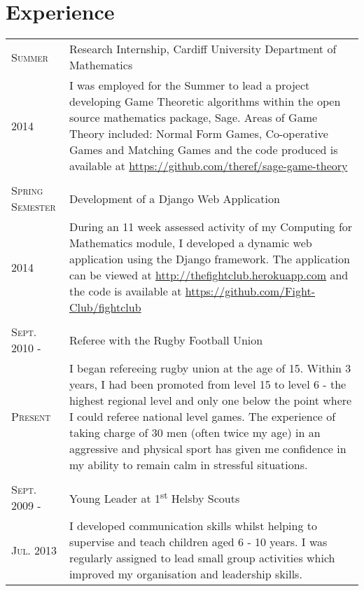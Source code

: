 \documentclass[a4paper]{article}
\begin{document}
\section{Experience}
\begin{tabularx}{\textwidth}{lX}

\textsc{Summer} & Research Internship, Cardiff University Department of Mathematics \\
\textsc{2014}& \footnotesize{I was employed for the Summer to lead a project developing Game Theoretic algorithms within the open source mathematics package, Sage. Areas of Game Theory included: Normal Form Games, Co-operative Games and Matching Games and the code produced is available at \url{https://github.com/theref/sage-game-theory}} \\
\\

\textsc{Spring Semester} & Development of a Django Web Application\\
\textsc{2014}& \footnotesize{During an 11 week assessed activity of my Computing for Mathematics module, I developed a dynamic web application using the Django framework. The application can be viewed at \url{http://thefightclub.herokuapp.com} and the code is available at \url{https://github.com/Fight-Club/fightclub}} \\
\\
\textsc{Sept. 2010 -} & Referee with the Rugby Football Union \\
\textsc{Present} & \footnotesize{I began refereeing rugby union at the age of 15. Within 3 years, I had been promoted from level 15 to level 6 - the highest regional level and only one below the point where I could referee national level games.
The experience of taking charge of 30 men (often twice my age) in an aggressive and physical sport has given me confidence in my ability to remain calm in stressful situations.}\\
\\
\textsc{Sept. 2009 -} & Young Leader at 1\textsuperscript{st} Helsby Scouts\\
\textsc{Jul. 2013}& \footnotesize{I developed communication skills whilst helping to supervise and teach children aged 6 - 10 years.
I was regularly assigned to lead small group activities which improved my organisation and leadership skills.}\\

\end{tabularx}
\end{document}

